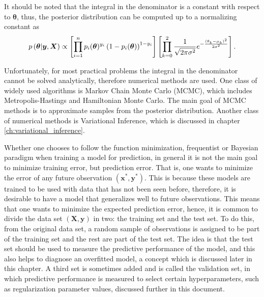 It should be noted that the integral in the denominator is a constant with respect to $\boldsymbol{\theta}$, thus, the posterior distribution can be computed up to a normalizing constant as
\begin{equation}
  p\left( \boldsymbol{\theta} | \boldsymbol{y}, \boldsymbol{X} \right) \propto
  \left[ \prod_{i = 1}^n  p_i(\boldsymbol{\theta})^{y_i}\left(1 - p_i(\boldsymbol{\theta}) \right)^{1 - y_i} \right]
  \left[ \prod_{k = 0}^2 \frac{1}{\sqrt{2 \pi \sigma^2}} e^{- \frac{(\theta_k - \mu_k)^2}{2\sigma^2}} \right].
\end{equation}

Unfortunately, for most practical problems the integral in the denominator cannot be solved analytically, therefore numerical methods are used. One class of widely used algorithms is Markov Chain Monte Carlo (MCMC), which includes Metropolis-Hastings and Hamiltonian Monte Carlo. The main goal of MCMC methods is to approximate samples from the posterior distribution. Another class of numerical methods is Variational Inference, which is discussed in chapter \ref{ch:variational_inference}.

Whether one chooses to follow the function minimization, frequentist or Bayesian paradigm when training a model for prediction, in general it is not the main goal to minimize training error, but prediction error. That is, one wants to minimize the error of any future observation $(\boldsymbol{x}^*, \boldsymbol{y}^*)$. This is because these models are trained to be used with data that has not been seen before, therefore, it is desirable to have a model that generalizes well to future observations. This means that one wants to minimize the expected prediction error, hence, it is common to divide the data set $(\boldsymbol{X}, \boldsymbol{y})$ in two: the training set and the test set. To do this, from the original data set, a random sample of observations is assigned to be part of the training set and the rest are part of the test set. The idea is that the test set should be used to measure the predictive performance of the model, and this also helps to diagnose an overfitted model, a concept which is discussed later in this chapter. A third set is sometimes added and is called the validation set, in which predictive performance is measured to select certain hyperparameters, such as regularization parameter values, discussed further in this document.

